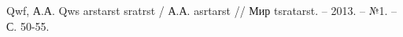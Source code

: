 \begingroup
\renewcommand{\section}[2]{\Anonsection{Список использованных источников}}
\begin{thebibliography}{00}

    Qwf, А.А.
    Qws arstarst sratrst /
    А.А. asrtarst //
    Мир tsratarst. -- 2013. -- №1. -- С. 50-55.

\end{thebibliography}
\endgroup

\clearpage
